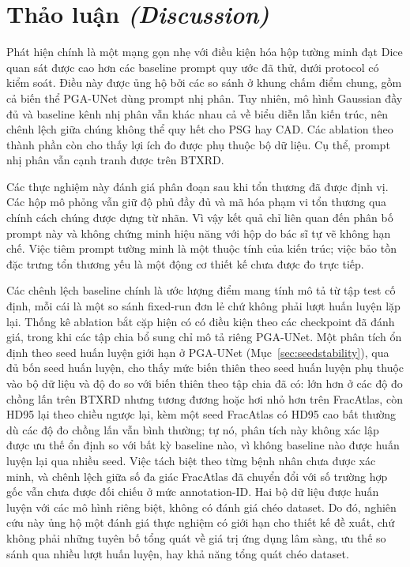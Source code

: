 \documentclass[11pt]{article}
\newcommand{\enlabel}[1]{{\small\itshape\color{gray} (#1)}}
\begin{document}
\section{Thảo luận \enlabel{Discussion}}
\label{sec:discussion}
Phát hiện chính là một mạng gọn nhẹ với điều kiện hóa hộp tường minh đạt Dice quan sát được cao hơn các baseline prompt quy ước đã thử, dưới protocol có kiểm soát. Điều này được ủng hộ bởi các so sánh ở khung chấm điểm chung, gồm cả biến thể PGA-UNet dùng prompt nhị phân. Tuy nhiên, mô hình Gaussian đầy đủ và baseline kênh nhị phân vẫn khác nhau cả về biểu diễn lẫn kiến trúc, nên chênh lệch giữa chúng không thể quy hết cho PSG hay CAD. Các ablation theo thành phần còn cho thấy lợi ích đo được phụ thuộc bộ dữ liệu. Cụ thể, prompt nhị phân vẫn cạnh tranh được trên BTXRD.

Các thực nghiệm này đánh giá phân đoạn sau khi tổn thương đã được định vị. Các hộp mô phỏng vẫn giữ độ phủ đầy đủ và mã hóa phạm vi tổn thương qua chính cách chúng được dựng từ nhãn. Vì vậy kết quả chỉ liên quan đến phân bố prompt này và không chứng minh hiệu năng với hộp do bác sĩ tự vẽ không hạn chế. Việc tiêm prompt tường minh là một thuộc tính của kiến trúc; việc bảo tồn đặc trưng tổn thương yếu là một động cơ thiết kế chưa được đo trực tiếp.

Các chênh lệch baseline chính là ước lượng điểm mang tính mô tả từ tập test cố định, mỗi cái là một so sánh fixed-run đơn lẻ chứ không phải lượt huấn luyện lặp lại. Thống kê ablation bắt cặp hiện có có điều kiện theo các checkpoint đã đánh giá, trong khi các tập chia bổ sung chỉ mô tả riêng PGA-UNet. Một phân tích ổn định theo seed huấn luyện giới hạn ở PGA-UNet (Mục~\ref{sec:seedstability}), qua đủ bốn seed huấn luyện, cho thấy mức biến thiên theo seed huấn luyện phụ thuộc vào bộ dữ liệu và độ đo so với biến thiên theo tập chia đã có: lớn hơn ở các độ đo chồng lấn trên BTXRD nhưng tương đương hoặc hơi nhỏ hơn trên FracAtlas, còn HD95 lại theo chiều ngược lại, kèm một seed FracAtlas có HD95 cao bất thường dù các độ đo chồng lấn vẫn bình thường; tự nó, phân tích này không xác lập được ưu thế ổn định so với bất kỳ baseline nào, vì không baseline nào được huấn luyện lại qua nhiều seed. Việc tách biệt theo từng bệnh nhân chưa được xác minh, và chênh lệch giữa số đa giác FracAtlas đã chuyển đổi với số trường hợp gốc vẫn chưa được đối chiếu ở mức annotation-ID. Hai bộ dữ liệu được huấn luyện với các mô hình riêng biệt, không có đánh giá chéo dataset. Do đó, nghiên cứu này ủng hộ một đánh giá thực nghiệm có giới hạn cho thiết kế đề xuất, chứ không phải những tuyên bố tổng quát về giá trị ứng dụng lâm sàng, ưu thế so sánh qua nhiều lượt huấn luyện, hay khả năng tổng quát chéo dataset.
\end{document}
